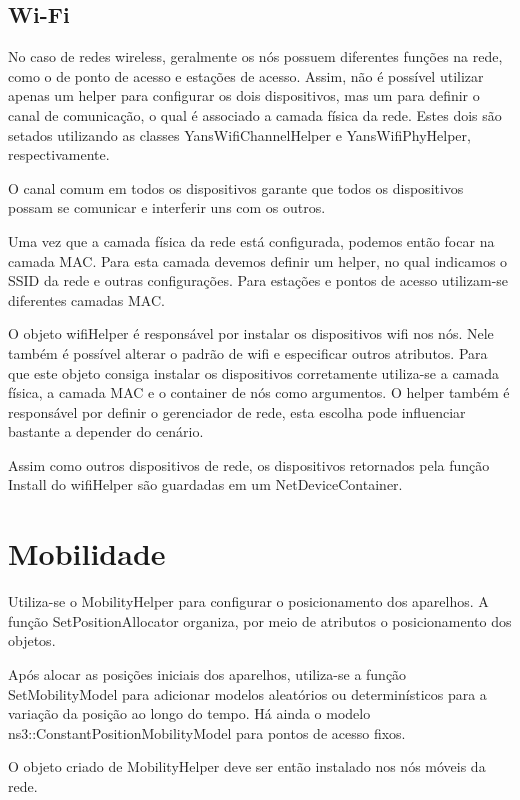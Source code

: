 \documentclass[14pt]{extarticle}
\begin{document}
\subsection{Wi-Fi}

No caso de redes wireless, geralmente os nós possuem diferentes funções na rede, como o de ponto de acesso e estações de
acesso. Assim, não é possível utilizar apenas um helper para configurar os dois dispositivos, mas um para definir o
canal de comunicação, o qual é associado a camada física da rede. Estes dois são setados utilizando as classes
YansWifiChannelHelper e YansWifiPhyHelper, respectivamente.

O canal comum em todos os dispositivos garante que todos os dispositivos possam se comunicar e interferir uns com os
outros.

Uma vez que a camada física da rede está configurada, podemos então focar na camada MAC. Para esta camada devemos
definir um helper, no qual indicamos o SSID da rede e outras configurações. Para estações e pontos de acesso utilizam-se
diferentes camadas MAC.

O objeto wifiHelper é responsável por instalar os dispositivos wifi nos nós. Nele também é possível alterar o padrão de
wifi e especificar outros atributos. Para que este objeto consiga instalar os dispositivos corretamente utiliza-se a
camada física, a camada MAC e o container de nós como argumentos. O helper também é responsável por definir o
gerenciador de rede, esta escolha pode influenciar bastante a depender do cenário.

Assim como outros dispositivos de rede, os dispositivos retornados pela função Install do wifiHelper são guardadas em um
NetDeviceContainer.

\section{Mobilidade}

Utiliza-se o MobilityHelper para configurar o posicionamento dos aparelhos. A função SetPositionAllocator organiza, por
meio de atributos o posicionamento dos objetos.

Após alocar as posições iniciais dos aparelhos, utiliza-se a função SetMobilityModel para adicionar modelos aleatórios
ou determinísticos para a variação da posição ao longo do tempo. Há ainda o modelo ns3::ConstantPositionMobilityModel
para pontos de acesso fixos.

O objeto criado de MobilityHelper deve ser então instalado nos nós móveis da rede.
\end{document}
